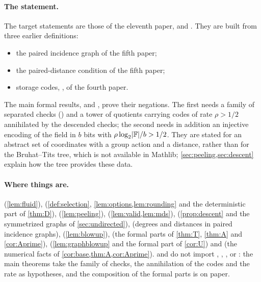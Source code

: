 \paragraph{The statement.} The target statements are those of the eleventh paper,  and
. They are built from three earlier definitions:
\begin{itemize}
\item the paired incidence graph  of the fifth paper;
\item the paired-distance condition  of the fifth paper;
\item storage codes, , of the fourth paper.
\end{itemize}
The main formal results,  and , prove their
negations. The first needs a family of separated checks () and a tower of quotients carrying
codes of rate $\rho>1/2$ annihilated by the descended checks; the second needs in addition an injective encoding of the
field in $b$ bits with $\rho\log_2\lvert \mathbb{F} \rvert/b>1/2$. They are stated for an abstract set of coordinates with a group action and a distance, rather than for
the Bruhat--Tits tree, which is not available in Mathlib; \cref{sec:peeling,sec:descent} explain how the tree provides
these data.

\paragraph{Where things are.}  (\cref{lem:fluid}),  (\cref{def:selection},
\cref{lem:options,lem:rounding} and the deterministic part of \cref{thm:D}),  (\cref{lem:peeling}),
 (\cref{lem:valid,lem:mds}),  (\cref{prop:descent} and the symmetrized graphs of
\cref{sec:undirected}),
 (degrees and distances in paired incidence graphs),  (\cref{lem:blowup}),
 (the formal parts of \cref{thm:T}, \cref{thm:A} and \cref{cor:Aprime}), 
(\cref{lem:graphblowup} and the formal part of \cref{cor:U}) and  (the numerical facts of
\cref{cor:base,thm:A,cor:Aprime}).  and  do not import ,
, ,  or : the main theorems take the
family of checks, the annihilation of the codes and the rate as hypotheses, and the composition of the formal parts is
on paper.
